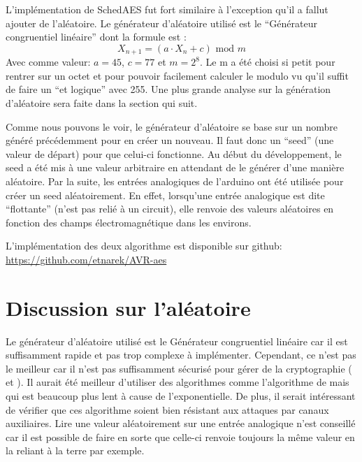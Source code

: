 \documentclass[letterpaper]{article}
\begin{document}
L'implémentation de SchedAES fut fort similaire à l'exception qu'il a fallut ajouter de l'aléatoire.
Le générateur d'aléatoire utilisé est le ``Générateur congruentiel linéaire'' dont la formule est :
$$ X_{n+1} = (a \cdot X_n  + c) \text{ mod } m$$
Avec comme valeur: $a=45$, $c=77$ et $m=2^8$. Le m a été choisi si petit pour rentrer sur un octet et pour pouvoir facilement calculer le modulo vu qu'il suffit de faire un ``et logique'' avec 255.
Une plus grande analyse sur la génération d'aléatoire sera faite dans la section qui suit.

Comme nous pouvons le voir, le générateur d'aléatoire se base sur un nombre généré précédemment pour en créer un nouveau.
Il faut donc un ``seed'' (une valeur de départ) pour que celui-ci fonctionne.
Au début du développement, le seed a été mis à une valeur arbitraire en attendant de le générer d'une manière aléatoire.
Par la suite, les entrées analogiques de l'arduino ont été utilisée pour créer un seed aléatoirement.
En effet, lorsqu'une entrée analogique est dite ``flottante'' (n'est pas relié à un circuit), elle renvoie des valeurs aléatoires en fonction des champs électromagnétique dans les environs.

L'implémentation des deux algorithme est disponible sur github: \url{https://github.com/etnarek/AVR-aes}

\section{Discussion sur l'aléatoire}
\label{sec:rand}
Le générateur d'aléatoire utilisé est le Générateur congruentiel linéaire car il est suffisamment rapide et pas trop complexe à implémenter.
Cependant, ce n'est pas le meilleur car il n'est pas suffisamment sécurisé pour gérer de la cryptographie (\cite{stern1987secret} et \cite{Plumstead1983}).
Il aurait été meilleur d'utiliser des algorithmes comme l'algorithme de \cite{blum1984generate} mais qui est beaucoup plus lent à cause de l'exponentielle.
De plus, il serait intéressant de vérifier que ces algorithme soient bien résistant aux attaques par canaux auxiliaires.
Lire une valeur aléatoirement sur une entrée analogique n'est conseillé car il est possible de faire en sorte que celle-ci renvoie toujours la même valeur en la reliant à la terre par exemple.
\end{document}
